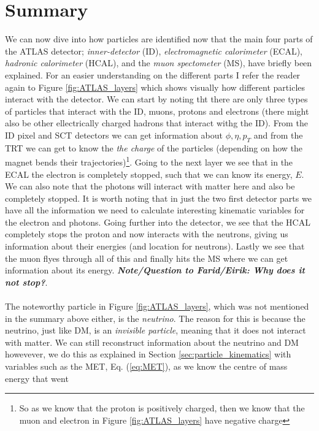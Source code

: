 \documentclass[14pt, a4paper]{book}
\begin{document}
\section{Summary}
We can now dive into how particles are identified now that the main four parts of the ATLAS detector; \textit{inner-detector} (ID), \textit{electromagnetic calorimeter} (ECAL), \textit{hadronic calorimeter} (HCAL), and the \textit{muon spectometer} (MS), have 
briefly been explained. For an easier understanding on the different parts I refer the reader again to Figure \ref{fig:ATLAS_layers} which shows visually how different particles interact with the detector. We can start by noting tht there are only three types 
of particles that interact with the ID, muons, protons and electrons (there might also be other ellectrically charged hadrons that interact withg the ID). From the ID pixel and SCT detectors we can get information about $\phi,\eta, p_T$ and from the TRT we  
can get to know the \textit{the charge} of the particles (depending on how the magnet bends their trajectories)\footnote{So as we know that the proton is positively charged, then we know that the muon and electron in Figure \ref{fig:ATLAS_layers} have negative charge}. 
Going to the next layer we see that in the ECAL the electron is completely stopped, such that we can know its energy, $E$. We can also note that the photons will interact with matter here and also be completely stopped. It is worth noting that in just the two 
first detector parts we have all the information we need to calculate interesting kinematic variables for the electron and photons. Going further into the detector, we see that the HCAL completely stops the proton and now interacts with the neutrons, giving us 
information about their energies (and location for neutrons). Lastly we see that the muon flyes through all of this and finally hits the MS where we can get information about its energy. \textit{\textbf{Note/Question to Farid/Eirik: Why does it not stop?}}. \\
\\The noteworthy particle in Figure \ref{fig:ATLAS_layers}, which was not mentioned in the summary above either, is the \textit{neutrino}. The reason for this is because the neutrino, just like DM, is an \textit{invisible particle}, meaning that it does not 
interact with matter. We can still reconstruct information about the neutrino and DM howevever, we do this as explained in Section \ref{sec:particle_kinematics} with variables such as the MET, Eq. (\ref{eq:MET}), as we know the centre of mass energy that went 
\end{document}
